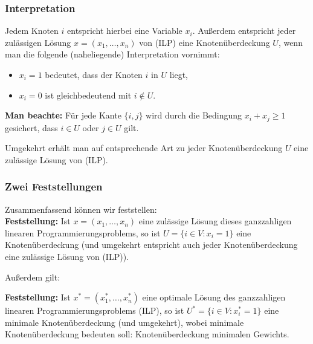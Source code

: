 \documentclass[smaller]{beamer}
\begin{document}
\begin{frame}
\frametitle{Interpretation}
Jedem Knoten $i$ entspricht hierbei eine Variable $x_i$. Außerdem entspricht jeder zulässigen Lösung $x = (x_1,\ldots,x_n)$ von (ILP) eine Knotenüberdeckung $U$, wenn man die folgende (naheliegende) \alert{Interpretation} vornimmt:
\begin{itemize}
 \item $x_i=1$ bedeutet, dass der Knoten $i$ in $U$ liegt,
 \item $x_i=0$ ist gleichbedeutend mit $i \notin U$.
\end{itemize}
\textbf{Man beachte:} Für jede Kante $\big\{ i,j \big\}$ wird durch die Bedingung $x_i+x_j \geq 1$ gesichert, dass $i \in U$ oder $j \in U$ gilt. \\ \vspace*{0.2cm}

Umgekehrt erhält man auf entsprechende Art zu jeder Knotenüberdeckung $U$ eine zulässige Lösung von (ILP). 
\end{frame}

\begin{frame}
\frametitle{Zwei Feststellungen}
Zusammenfassend können wir feststellen:\\ \vspace*{0.2cm}
\textbf{Feststellung:}
Ist $x = (x_1,\ldots,x_n)$ eine \alert{zulässige Lösung dieses ganzzahligen linearen Programmierungsproblems}, so ist $U = \big\{ i \in V : x_i = 1 \big\}$ \alert{eine Knotenüberdeckung} (und umgekehrt entspricht auch jeder Knotenüberdeckung eine zulässige Lösung von (ILP)). \\ \vspace*{0.2cm}

Außerdem gilt: \\ \vspace*{0.2cm}

\textbf{Feststellung:}
Ist $x^* = (x_1^*,\ldots,x_n^*)$ eine \alert{optimale Lösung des ganzzahligen linearen Programmierungsproblems (ILP)}, so ist $U^* = \bigl\{ i \in V : x_i^* = 1 \bigr\}$ eine \alert{minimale Knotenüberdeckung (und umgekehrt)}, wobei minimale Knotenüberdeckung bedeuten soll: Knotenüberdeckung minimalen Gewichts.
\end{frame}
\end{document}
